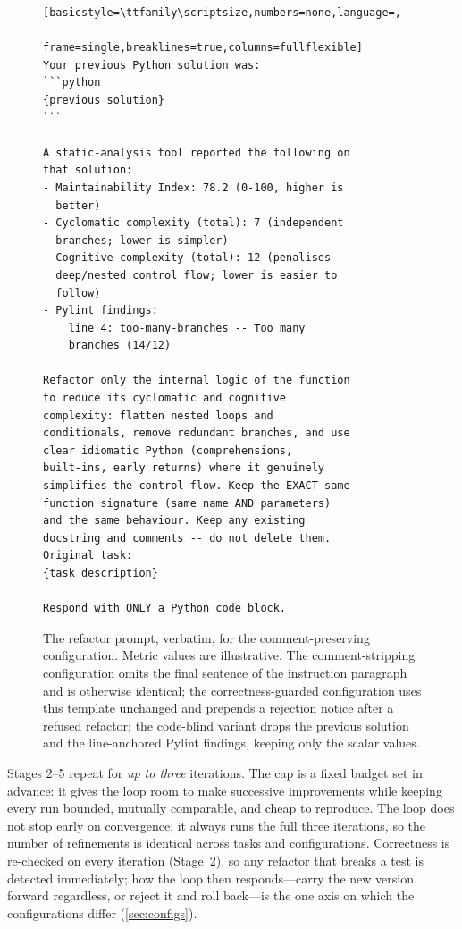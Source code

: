 \begin{figure}[t]
\begin{lstlisting}[basicstyle=\ttfamily\scriptsize,numbers=none,language=,
                   frame=single,breaklines=true,columns=fullflexible]
Your previous Python solution was:
```python
{previous solution}
```

A static-analysis tool reported the following on
that solution:
- Maintainability Index: 78.2 (0-100, higher is
  better)
- Cyclomatic complexity (total): 7 (independent
  branches; lower is simpler)
- Cognitive complexity (total): 12 (penalises
  deep/nested control flow; lower is easier to
  follow)
- Pylint findings:
    line 4: too-many-branches -- Too many
    branches (14/12)

Refactor only the internal logic of the function
to reduce its cyclomatic and cognitive
complexity: flatten nested loops and
conditionals, remove redundant branches, and use
clear idiomatic Python (comprehensions,
built-ins, early returns) where it genuinely
simplifies the control flow. Keep the EXACT same
function signature (same name AND parameters)
and the same behaviour. Keep any existing
docstring and comments -- do not delete them.
Original task:
{task description}

Respond with ONLY a Python code block.
\end{lstlisting}
\caption{The refactor prompt, verbatim, for the comment-preserving configuration.
  Metric values are illustrative. The comment-stripping configuration omits the
  final sentence of the instruction paragraph and is otherwise identical; the
  correctness-guarded configuration uses this template unchanged and prepends a
  rejection notice after a refused refactor; the code-blind variant drops the
  previous solution and the line-anchored Pylint findings, keeping only the scalar
  values.}
\label{fig:prompt}
\end{figure}

Stages 2--5 repeat for \emph{up to three} iterations. The cap is a fixed budget set
in advance: it gives the loop room to make successive improvements while keeping
every run bounded, mutually comparable, and cheap to reproduce. The loop does not stop early on convergence; it always runs the full three
iterations, so the number of refinements is identical across tasks and configurations. Correctness is
re-checked on every iteration (Stage~2), so any refactor that breaks a test is
detected immediately; how the loop then responds---carry the new version forward
regardless, or reject it and roll back---is the one axis on which the
configurations differ (\cref{sec:configs}).

